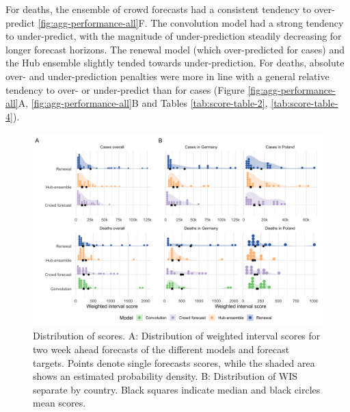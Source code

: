 \documentclass[10pt,letterpaper]{article}
\begin{document}
For deaths, the ensemble of crowd forecasts had a consistent tendency to
over-predict \ref{fig:agg-performance-all}F. The convolution model had a
strong tendency to under-predict, with the magnitude of under-prediction
steadily decreasing for longer forecast horizons. The renewal model
(which over-predicted for cases) and the Hub ensemble slightly tended
towards under-prediction. For deaths, absolute over- and
under-prediction penalties were more in line with a general relative
tendency to over- or under-predict than for cases (Figure
\ref{fig:agg-performance-all}A, \ref{fig:agg-performance-all}B and
Tables \ref{tab:score-table-2}, \ref{tab:score-table-4}).

\begin{figure}[H]
\includegraphics[width=1\linewidth,]{../analysis/plots/distribution_scores_wis-2} \caption{Distribution of scores. A: Distribution of weighted interval scores for two week ahead forecasts of the different models and forecast targets. Points denote single forecasts scores, while the shaded area shows an estimated probability density. B: Distribution of WIS separate by country. Black squares indicate median and black circles mean scores.}\label{fig:distribution-scores}
\end{figure}
\end{document}
